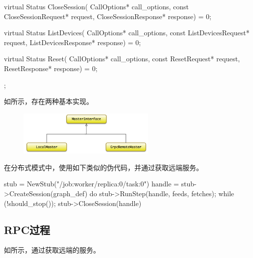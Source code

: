 \begin{content}
\begin{content}
\begin{leftbar}
\begin{c++}
{  virtual Status CloseSession(
    CallOptions* call_options,
    const CloseSessionRequest* request,
    CloseSessionResponse* response) = 0;

  virtual Status ListDevices(
    CallOptions* call_options,
    const ListDevicesRequest* request,
    ListDevicesResponse* response) = 0;

  virtual Status Reset(
    CallOptions* call_options, const ResetRequest* request,
    ResetResponse* response) = 0;
};
\end{c++}
\end{leftbar}

如所示，存在两种基本实现。

\begin{enum}
\end{enum}

\begin{figure}[H]
\centering
\includegraphics[width=0.6\textwidth]{figures/dist-master-interface.png}
\caption{}
 \label{fig:dist-master-interface}
\end{figure}

在分布式模式中，使用如下类似的伪代码，并通过获取远端服务。

\begin{leftbar}
\begin{c++}
stub = NewStub("/job:worker/replica:0/task:0")
handle = stub->CreateSession({graph_def})
do {
  stub->RunStep(handle, feeds, fetches);
} while (!should_stop());
stub->CloseSession({handle})
\end{c++}
\end{leftbar}

\subsection{RPC过程}

如所示，通过获取远端的服务。


\end{content}
\end{content}
